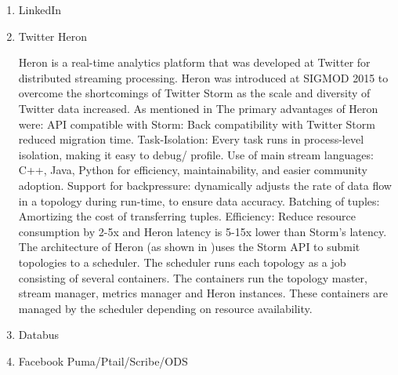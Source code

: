 \begin{enumerate}
\item {} 
LinkedIn

\item {} 
Twitter Heron

Heron is a real-time analytics platform that was developed at
Twitter for distributed streaming processing. Heron was
introduced at SIGMOD 2015 to overcome the shortcomings of Twitter
Storm as the scale and diversity of Twitter data increased. As
mentioned in \label{\detokenize{i524/technologies:id271}}{\hyperref[\detokenize{i524/technologies:twitterheronopen}]{\sphinxcrossref{{[}226{]}}}} The primary advantages of
Heron were: API compatible with Storm: Back compatibility with
Twitter Storm reduced migration time. Task-Isolation: Every task
runs in process-level isolation, making it easy to debug/
profile. Use of main stream languages: C++, Java, Python for
efficiency, maintainability, and easier community
adoption. Support for backpressure: dynamically adjusts the rate
of data flow in a topology during run-time, to ensure data
accuracy. Batching of tuples: Amortizing the cost of transferring
tuples. Efficiency: Reduce resource consumption by 2-5x and Heron
latency is 5-15x lower than Storm’s latency. The architecture of
Heron (as shown in \label{\detokenize{i524/technologies:id272}}{\hyperref[\detokenize{i524/technologies:twitterheron}]{\sphinxcrossref{{[}227{]}}}})uses the Storm API to
submit topologies to a scheduler. The scheduler runs each
topology as a job consisting of several containers. The
containers run the topology master, stream manager, metrics
manager and Heron instances. These containers are managed by the
scheduler depending on resource availability.

\item {} 
Databus

\item {} 
Facebook Puma/Ptail/Scribe/ODS


\end{enumerate}
